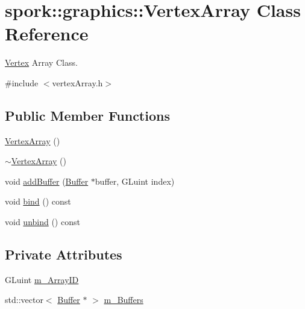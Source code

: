 \hypertarget{classspork_1_1graphics_1_1_vertex_array}{}\section{spork\+:\+:graphics\+:\+:Vertex\+Array Class Reference}
\label{classspork_1_1graphics_1_1_vertex_array}


\hyperlink{structspork_1_1graphics_1_1_vertex}{Vertex} Array Class.  




{\ttfamily \#include $<$vertex\+Array.\+h$>$}

\subsection*{Public Member Functions}
\begin{DoxyCompactItemize}
\item 
\hyperlink{classspork_1_1graphics_1_1_vertex_array_a13e593f72368d3de20f1204cf6e756dd}{Vertex\+Array} ()
\item 
\hyperlink{classspork_1_1graphics_1_1_vertex_array_a6e501bb3893c396e1ccf66720e5222ab}{$\sim$\+Vertex\+Array} ()
\item 
void \hyperlink{classspork_1_1graphics_1_1_vertex_array_a27b13c452475f5b7a2eb8a3b2f86bc3d}{add\+Buffer} (\hyperlink{classspork_1_1graphics_1_1_buffer}{Buffer} $\ast$buffer, G\+Luint index)
\item 
void \hyperlink{classspork_1_1graphics_1_1_vertex_array_ad70dc1434cfd15b821d5f24ffdf82cb4}{bind} () const
\item 
void \hyperlink{classspork_1_1graphics_1_1_vertex_array_a6bc4197579700d9801bbc731aaa28351}{unbind} () const
\end{DoxyCompactItemize}
\subsection*{Private Attributes}
\begin{DoxyCompactItemize}
\item 
G\+Luint \hyperlink{classspork_1_1graphics_1_1_vertex_array_a52da6aa84afc82535e4c84c19ff438ad}{m\+\_\+\+Array\+ID}
\item 
std\+::vector$<$ \hyperlink{classspork_1_1graphics_1_1_buffer}{Buffer} $\ast$ $>$ \hyperlink{classspork_1_1graphics_1_1_vertex_array_ac73ece6d36263668e29d31a43e2886ea}{m\+\_\+\+Buffers}
\end{DoxyCompactItemize}


